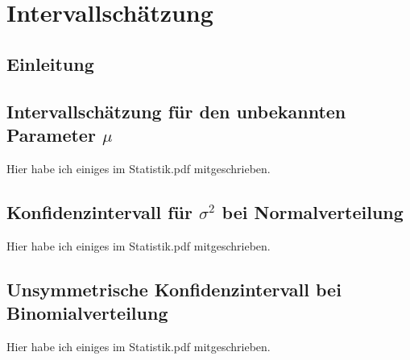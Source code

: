 \documentclass[a4paper]{article}
\title{\docTitle}
\author{Moritz}
\date{\today}
\begin{document}
\maketitle
\tableofcontents


\section{Intervallschätzung}

\subsection{Einleitung}


\subsection{Intervallschätzung für den unbekannten Parameter $\mu$}

Hier habe ich einiges im Statistik.pdf mitgeschrieben.


\subsection{Konfidenzintervall für $\sigma^2$ bei Normalverteilung}

Hier habe ich einiges im Statistik.pdf mitgeschrieben.



\subsection{Unsymmetrische Konfidenzintervall bei Binomialverteilung}

Hier habe ich einiges im Statistik.pdf mitgeschrieben.

\end{document}
